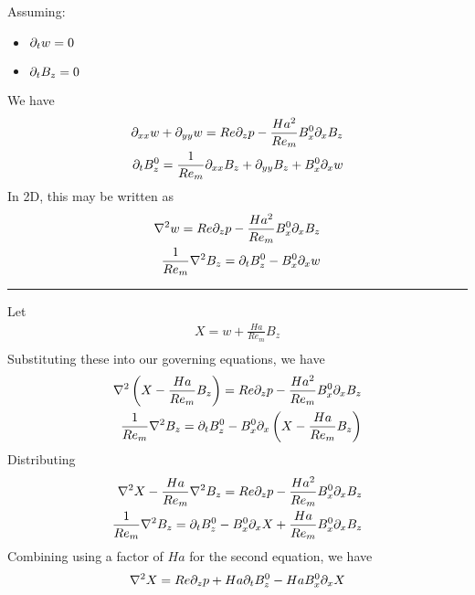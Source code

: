 \documentclass[11pt]{article}
\begin{document}
Assuming:
\begin{itemize}\setlength\itemsep{-1em}
	\item $\partial_t w = 0$
	\item $\partial_t B_z = 0$
\end{itemize}
We have
\begin{equation}\begin{aligned}
\partial_{xx}w+\partial_{yy}w = Re\partial_z p - \frac{Ha^2}{Re_m} B_x^0 \partial_x B_z \\
\partial_t B_z^0 = \frac{1}{Re_m} \partial_{xx} B_z + \partial_{yy} B_z + B_x^0 \partial_x w \\
\end{aligned} \end{equation}
In 2D, this may be written as
\begin{equation}\begin{aligned}
\nabla^2 w = Re\partial_z p - \frac{Ha^2}{Re_m} B_x^0 \partial_x B_z \\
\frac{1}{Re_m} \nabla^2 B_z = \partial_t B_z^0 - B_x^0 \partial_x w \\
\end{aligned} \end{equation}

\noindent \rule{\textwidth}{1pt}
Let
\begin{equation}\begin{aligned}
X = w + \frac{Ha}{Re_m} B_z \\
\end{aligned} \end{equation}
Substituting these into our governing equations, we have
\begin{equation}\begin{aligned}
\nabla^2 \left( X - \frac{Ha}{Re_m} B_z \right) = Re\partial_z p - \frac{Ha^2}{Re_m} B_x^0 \partial_x B_z \\
\frac{1}{Re_m} \nabla^2 B_z = \partial_t B_z^0 - B_x^0 \partial_x \left( X - \frac{Ha}{Re_m} B_z \right) \\
\end{aligned} \end{equation}
Distributing
\begin{equation}\begin{aligned}
\nabla^2 X - \frac{Ha}{Re_m} \nabla^2 B_z = Re\partial_z p - \frac{Ha^2}{Re_m} B_x^0 \partial_x B_z \\
\frac{1}{Re_m} \nabla^2 B_z = \partial_t B_z^0 - B_x^0 \partial_x X + \frac{Ha}{Re_m} B_x^0 \partial_x B_z \\
\end{aligned} \end{equation}
Combining using a factor of $Ha$ for the second equation, we have
\begin{equation}\begin{aligned}
\nabla^2 X = Re\partial_z p + Ha \partial_t B_z^0 - Ha B_x^0 \partial_x X \\
\end{aligned} \end{equation}
\end{document}
